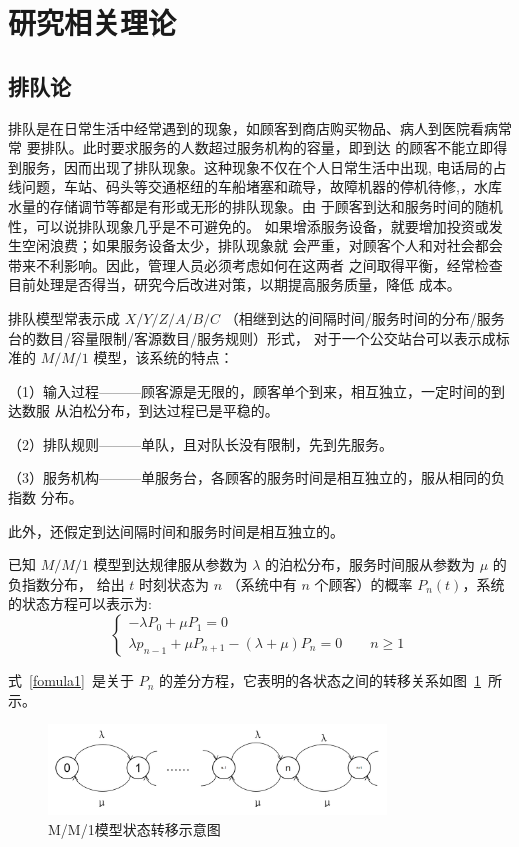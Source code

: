 \section{研究相关理论}

\subsection{排队论}
排队是在日常生活中经常遇到的现象，如顾客到商店购买物品、病人到医院看病常常
要排队。此时要求服务的人数超过服务机构的容量，即到达
的顾客不能立即得到服务，因而出现了排队现象。这种现象不仅在个人日常生活中出现,
电话局的占线问题，车站、码头等交通枢纽的车船堵塞和疏导，故障机器的停机待修,，水库
水量的存储调节等都是有形或无形的排队现象。由
于顾客到达和服务时间的随机性，可以说排队现象几乎是不可避免的。
如果增添服务设备，就要增加投资或发生空闲浪费；如果服务设备太少，排队现象就
会严重，对顾客个人和对社会都会带来不利影响。因此，管理人员必须考虑如何在这两者
之间取得平衡，经常检查目前处理是否得当，研究今后改进对策，以期提高服务质量，降低
成本\cite{ycx}。

排队模型常表示成 $X/Y/Z/A/B/C$ （相继到达的间隔时间/服务时间的分布/服务台的数目/容量限制/客源数目/服务规则）形式，
对于一个公交站台可以表示成标准的 $M/M/1$ 模型，该系统的特点：

（1）输入过程———顾客源是无限的，顾客单个到来，相互独立，一定时间的到达数服
从泊松分布，到达过程已是平稳的。

（2）排队规则———单队，且对队长没有限制，先到先服务。

（3）服务机构———单服务台，各顾客的服务时间是相互独立的，服从相同的负指数
分布。

此外，还假定到达间隔时间和服务时间是相互独立的。

已知 $M/M/1$ 模型到达规律服从参数为 $\lambda$ 的泊松分布，服务时间服从参数为 $\mu$ 的负指数分布，
给出 $t$ 时刻状态为 $n$ （系统中有 $n$ 个顾客）的概率 $P_{n}(t)$，系统的状态方程可以表示为:
\begin{equation}\label{fomula1}
    \begin{cases}
        -\lambda P_0 + \mu P_1 = 0
        \\
       \lambda p_{n - 1} + \mu P_{n + 1} - (\lambda + \mu)P_n = 0 \qquad n\ge 1
       \end{cases}
\end{equation}

式~\ref{fomula1}~是关于 $P_{n}$ 的差分方程，它表明的各状态之间的转移关系如图~\ref{fig21}~所示。

\begin{figure}[h]
\centering
\includegraphics[width=0.80\textwidth]{figs/chap02/fig21.png}
\caption{M/M/1模型状态转移示意图}
\label{fig21}
\end{figure}